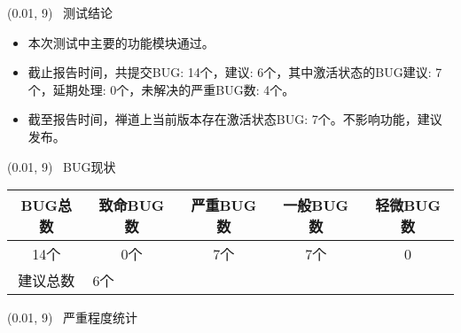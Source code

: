 \documentclass{article}
\begin{document}
\par{}

\colorbox{myblue}{\makebox(0.01, 9){\ }} 测试结论\\
\begin{itemize}
\item 本次测试中主要的功能模块通过。
\item 截止报告时间，共提交BUG: 14个，建议: 6个，其中激活状态的BUG建议: 7个，延期处理: 0个，未解决的严重BUG数: 4个。
\item 截至报告时间，禅道上当前版本存在激活状态BUG: 7个。不影响功能，建议发布。
\end{itemize}


\colorbox{myblue}{\makebox(0.01, 9){\ }} BUG现状\\

\begin{table}[H]
\renewcommand{\arraystretch}{2}
\begin{tabular}{|c|c|c|c|c|}
\hline
BUG总数 & 致命BUG数 & 严重BUG数 & 一般BUG数 & 轻微BUG数 \\

\hline
14个 &0个 & 7个 & 7个 & 0\\
\hline
建议总数 & \multicolumn{4}{|l|}{6个} \\
\hline

\end{tabular}
\end{table}

\colorbox{myblue}{\makebox(0.01, 9){\ }} 严重程度统计\\

\begin{figure}[!hbp]

\dataset

\end{figure}
\end{document}
